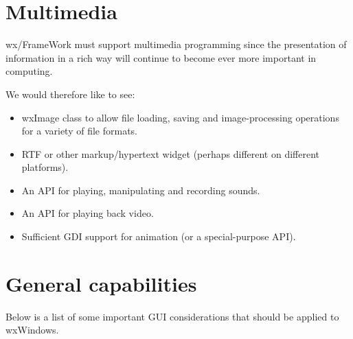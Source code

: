 \section{Multimedia}

wx/FrameWork must support multimedia programming since the presentation
of information in a rich way will continue to become ever more important
in computing.

We would therefore like to see:

\begin{itemize}
\item wxImage class to allow file loading, saving and image-processing
operations for a variety of file formats.
\item RTF or other markup/hypertext widget (perhaps different on
different platforms).
\item An API for playing, manipulating and recording sounds.
\item An API for playing back video.
\item Sufficient GDI support for animation (or a special-purpose API).
\end{itemize}

\section{General capabilities}

Below is a list of some important GUI considerations that should be
applied to wxWindows.

